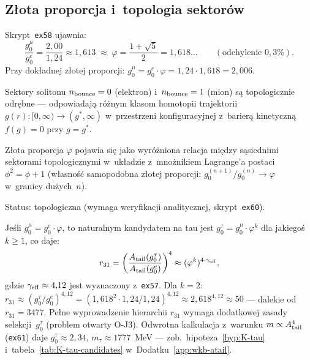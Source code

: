 \subsection{Złota proporcja i~topologia sektorów}\label{app:J-zlota}

\begin{remark}\label{rem:J-golden}
Skrypt~\texttt{ex58} ujawnia:
\begin{equation}\label{eq:J-golden}
  \frac{g_0^\mu}{g_0^e} = \frac{2{,}00}{1{,}24} \approx 1{,}613
  \;\approx\; \varphi = \frac{1 + \sqrt{5}}{2} = 1{,}618\ldots
  \qquad (\text{odchylenie } 0{,}3\%).
\end{equation}
Przy dokładnej złotej proporcji: $g_0^\mu = g_0^e \cdot \varphi = 1{,}24 \cdot 1{,}618 = 2{,}006$.
\end{remark}

\begin{hypothesis}\label{hyp:J-golden-topo}
Sektory solitonu $n_{\rm bounce} = 0$ (elektron) i~$n_{\rm bounce} = 1$ (mion)
są topologicznie odrębne --- odpowiadają różnym klasom homotopii trajektorii
$g(r)\colon [0,\infty) \to (g^*, \infty)$ w~przestrzeni konfiguracyjnej
z~barierą kinetyczną $f(g) = 0$ przy $g = g^*$.

Złota proporcja $\varphi$ pojawia się jako wyróżniona relacja między
sąsiednimi sektorami topologicznymi w~układzie z~mnożnikiem Lagrange'a
postaci $\phi^2 = \phi + 1$ (własność samopodobna złotej proporcji:
$g_0^{(n+1)}/g_0^{(n)} \to \varphi$ w~granicy dużych~$n$).

Status:  topologiczna (wymaga weryfikacji
analitycznej, skrypt~\texttt{ex60}).
\end{hypothesis}

\begin{remark}\label{rem:J-tau}
Jeśli $g_0^\mu = g_0^e \cdot \varphi$, to naturalnym kandydatem
na tau jest $g_0^\tau = g_0^\mu \cdot \varphi^k$ dla jakiegoś
$k \geq 1$, co daje:
\[
  r_{31} = \left(\frac{A_{\rm tail}(g_0^\tau)}{A_{\rm tail}(g_0^e)}\right)^4
  \approx (\varphi^k)^{4 \cdot \gamma_{\rm eff}},
\]
gdzie $\gamma_{\rm eff} \approx 4{,}12$ jest wyznaczony z~\texttt{ex57}.
Dla $k = 2$: $r_{31} \approx (g_0^\tau/g_0^e)^{4{,}12}
= (1{,}618^2 \cdot 1{,}24/1{,}24)^{4{,}12} \approx 2{,}618^{4{,}12} \approx 50$
--- dalekie od $r_{31} = 3477$.
Pełne wyprowadzenie hierarchii $r_{31}$ wymaga dodatkowej
zasady selekcji~$g_0^\tau$ (problem otwarty O-J3).
Odwrotna kalkulacja z~warunku $m \propto A_{\rm tail}^4$ (\texttt{ex61})
daje $g_0^\tau \approx 2{,}34$, $m_\tau \approx 1777$~MeV ---
zob.\ hipoteza~\ref{hyp:K-tau} i~tabela~\ref{tab:K-tau-candidates}
w~Dodatku~\ref{app:wkb-atail}.
\end{remark}


